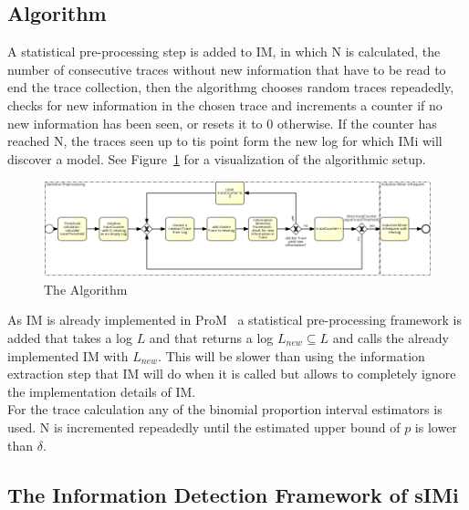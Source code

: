 \documentclass[
	a4paper,
	pagesize,
	pdftex,
	12pt,
	twoside, %
	BCOR=5mm, %
	ngerman,
	fleqn,
	final,
	]{scrartcl}
\begin{document}
\subsection{Algorithm}
A statistical pre-processing step is added to IM, in which N is calculated, the number of consecutive traces without new information that have to be read to end the trace collection, then the algorithmg chooses random traces repeadedly, checks for new information in the chosen trace and increments a counter if no new information has been seen, or resets it to 0 otherwise. If the counter has reached N, the traces seen up to tis point form the new log for which IMi will discover a model. See Figure~\ref{fig:algorithm} for a visualization of the algorithmic setup.\\
\begin{figure}[h]
	\caption{The Algorithm}
	\label{fig:algorithm}
	\includegraphics[width=\linewidth]{Algorithm.png}
\end{figure}
As IM is already implemented in ProM~\cite{ProM} a statistical pre-processing framework is added that takes a log $L$ and that returns a log $L_{new}\subseteq L$ and calls the already implemented IM with $L_{new}$. This will be slower than using the information extraction step that IM will do when it is called but allows to completely ignore the implementation details of IM.\\
For the trace calculation any of the binomial proportion interval estimators is used. N is incremented repeadedly until the estimated upper bound of $p$ is lower than $\delta$.\\
\subsection{The Information Detection Framework of sIMi}
\end{document}
